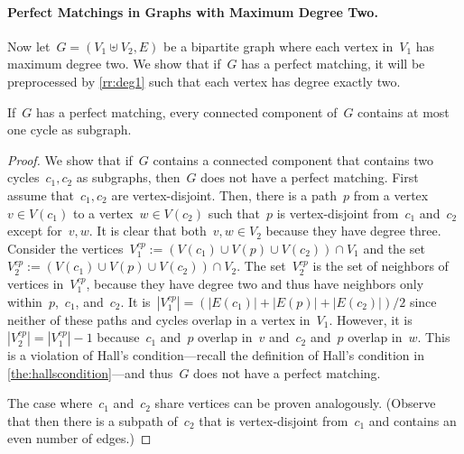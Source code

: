 \paragraph{Perfect Matchings in Graphs with Maximum Degree Two.} Now let~$G = (V_1 \uplus V_2, E)$ be a bipartite graph where each vertex in~$V_1$ has maximum degree two. We show that if~$G$ has a perfect matching, it will be preprocessed by \autoref{rr:deg1} such that each vertex has degree exactly two.
\begin{lemma}\label{lem:perfmatchatmostonecycle}
  If~$G$ has a perfect matching, every connected component of~$G$ contains at most one cycle as subgraph.
\end{lemma}
\begin{proof}
  We show that if~$G$ contains a connected component that contains two cycles~$c_1, c_2$ as subgraphs, then~$G$ does not have a perfect matching. First assume that~$c_1, c_2$ are vertex-disjoint. Then, there is a path~$p$ from a vertex~$v \in V(c_1)$ to a vertex~$w \in V(c_2)$ such that~$p$ is vertex-disjoint from~$c_1$ and~$c_2$ except for~$v, w$. It is clear that both~$v, w \in V_2$ because they have degree three. Consider the vertices~$V_1^{cp}:=(V(c_1) \cup V(p) \cup V(c_2)) \cap V_1$ and the set~$V_2^{cp}:=(V(c_1) \cup V(p) \cup V(c_2)) \cap V_2$. The set~$V_2^{cp}$ is the set of neighbors of vertices in~$V_1^{cp}$, because they have degree two and thus have neighbors only within~$p$,~$c_1$, and~$c_2$. It is~$|V_1^{cp}| = (|E(c_1)| + |E(p)| + |E(c_2)|) / 2$ since neither of these paths and cycles overlap in a vertex in~$V_1$. However, it is~$|V_2^{cp}| = |V_1^{cp}| - 1$ because~$c_1$ and~$p$ overlap in~$v$ and~$c_2$ and~$p$ overlap in~$w$. This is a violation of Hall's condition---recall the definition of Hall's condition in \autoref{the:hallscondition}---and thus~$G$ does not have a perfect matching.

  The case where~$c_1$ and~$c_2$ share vertices can be proven analogously. (Observe that then there is a subpath of~$c_2$ that is vertex-disjoint from~$c_1$ and contains an even number of edges.)
\end{proof}

